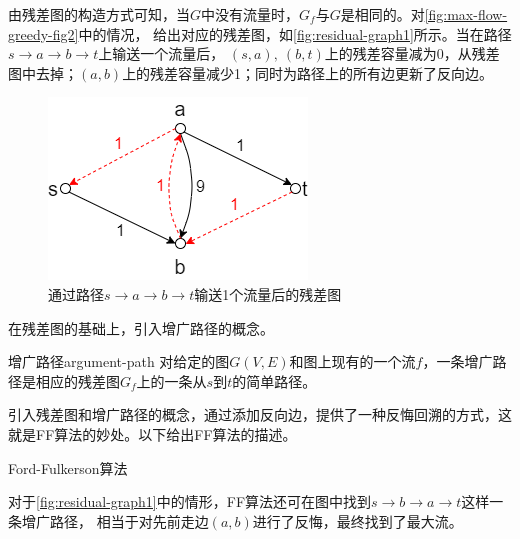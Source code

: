 	\par 由残差图的构造方式可知，当\(G\)中没有流量时，\(G_f\)与\(G\)是相同的。对\autoref{fig:max-flow-greedy-fig2}中的情况，
		给出对应的残差图，如\autoref{fig:residual-graph1}所示。当在路径\(s \to a \to b \to t\)上输送一个流量后，
		\((s,a),\ (b,t)\)上的残差容量减为0，从残差图中去掉；\((a,b)\)上的残差容量减少1；同时为路径上的所有边更新了反向边。
	
		\begin{figure}[hbt]
			\centering
			\includegraphics[scale=0.5]{image/network-flow-residual-graph1.png}
			\caption{通过路径\(s \to a \to b \to t\)输送1个流量后的残差图}\label{fig:residual-graph1}
		\end{figure}


	\par 在残差图的基础上，引入增广路径的概念。

\begin{definition}{增广路径}{argument-path}
	对给定的图\(G(V,E)\)和图上现有的一个流\(f\)，一条增广路径是相应的残差图\(G_f\)上的一条从\(s\)到\(t\)的简单路径。
\end{definition}

	\par 引入残差图和增广路径的概念，通过添加反向边，提供了一种反悔回溯的方式，这就是FF算法的妙处。以下给出FF算法的描述。

\begin{algorithm}[hbt]
	\caption{Ford-Fulkerson算法}\label{alg:ford-fulkerson}
\end{algorithm}

	\par 对于\autoref{fig:residual-graph1}中的情形，FF算法还可在图中找到\(s \to b \to a \to t\)这样一条增广路径，
	相当于对先前走边\((a,b)\)进行了反悔，最终找到了最大流。

